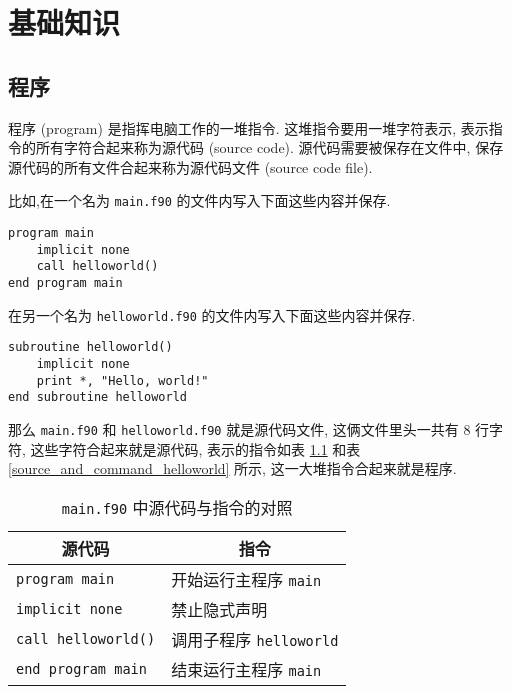 \chapter{基础知识}

\section{程序}\label{fortran_program}

程序 (program) 是指挥电脑工作的一堆指令. 这堆指令要用一堆字符表示, 表示指令的所有字符合起来称为源代码 (source code). 源代码需要被保存在文件中, 保存源代码的所有文件合起来称为源代码文件 (source code file).

比如,在一个名为 \texttt{main.f90} 的文件内写入下面这些内容并保存.
\begin{lstlisting}
program main
    implicit none
    call helloworld()
end program main
\end{lstlisting}
在另一个名为 \texttt{helloworld.f90} 的文件内写入下面这些内容并保存.
\begin{lstlisting}
subroutine helloworld()
    implicit none
    print *, "Hello, world!"
end subroutine helloworld
\end{lstlisting}
那么 \texttt{main.f90} 和 \texttt{helloworld.f90} 就是源代码文件, 这俩文件里头一共有 8 行字符, 这些字符合起来就是源代码, 表示的指令如表 \ref{source_and_command_main} 和表 \ref{source_and_command_helloworld} 所示, 这一大堆指令合起来就是程序.
\begin{table}[!htbp]
    \centering
    \begin{tabular}{|p{}|p{}|}
        \hline
        \multicolumn{1}{|c|}{源代码}&\multicolumn{1}{|c|}{指令}\\
        \hline
        \texttt{program main}&开始运行主程序 \texttt{main}\\
        \hline
        \texttt{implicit none}&禁止隐式声明\\
        \hline
        \texttt{call helloworld()}&调用子程序 \texttt{helloworld}\\
        \hline
        \texttt{end program main}&结束运行主程序 \texttt{main}\\
        \hline
    \end{tabular}
    \caption{\texttt{main.f90} 中源代码与指令的对照}\label{source_and_command_main}
\end{table}
